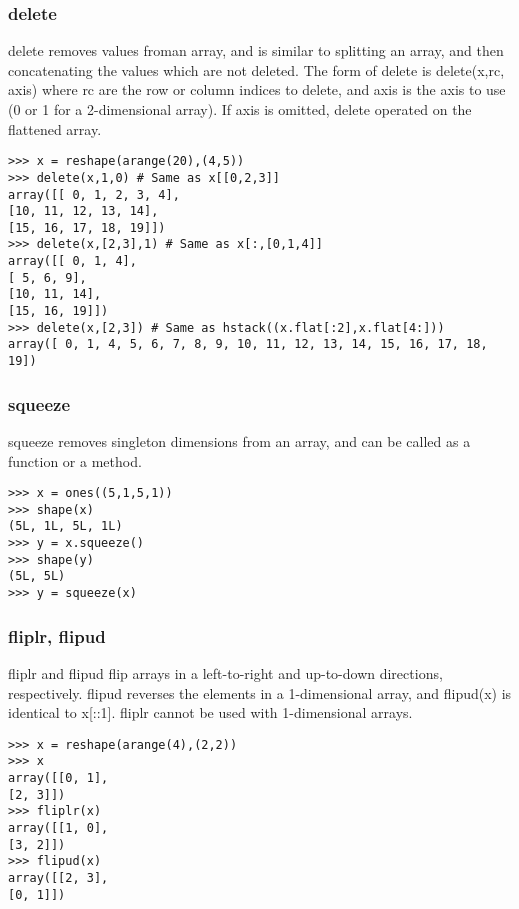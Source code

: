 \documentclass[KSmain.tex]{subfiles}
\begin{document}
\subsubsection{delete}
delete removes values froman array, and is similar to splitting an array, and then concatenating the values
which are not deleted. The form of delete is delete(x,rc, axis) where rc are the row or column indices to
delete, and axis is the axis to use (0 or 1 for a 2-dimensional array). If axis is omitted, delete operated on
the flattened array.
\begin{framed}
\begin{verbatim}
>>> x = reshape(arange(20),(4,5))
>>> delete(x,1,0) # Same as x[[0,2,3]]
array([[ 0, 1, 2, 3, 4],
[10, 11, 12, 13, 14],
[15, 16, 17, 18, 19]])
>>> delete(x,[2,3],1) # Same as x[:,[0,1,4]]
array([[ 0, 1, 4],
[ 5, 6, 9],
[10, 11, 14],
[15, 16, 19]])
>>> delete(x,[2,3]) # Same as hstack((x.flat[:2],x.flat[4:]))
array([ 0, 1, 4, 5, 6, 7, 8, 9, 10, 11, 12, 13, 14, 15, 16, 17, 18,
19])
\end{verbatim}
\end{framed}
\subsubsection{squeeze}
squeeze removes singleton dimensions from an array, and can be called as a function or a method.
\begin{framed}
\begin{verbatim}
>>> x = ones((5,1,5,1))
>>> shape(x)
(5L, 1L, 5L, 1L)
>>> y = x.squeeze()
>>> shape(y)
(5L, 5L)
>>> y = squeeze(x)
\end{verbatim}
\end{framed}
\subsubsection{fliplr, flipud}
fliplr and flipud flip arrays in a left-to-right and up-to-down directions, respectively. flipud reverses
the elements in a 1-dimensional array, and flipud(x) is identical to x[::1].
fliplr cannot be used with 1-dimensional arrays.
\begin{framed}
\begin{verbatim}
>>> x = reshape(arange(4),(2,2))
>>> x
array([[0, 1],
[2, 3]])
>>> fliplr(x)
array([[1, 0],
[3, 2]])
>>> flipud(x)
array([[2, 3],
[0, 1]])
\end{verbatim}
\end{framed}
\end{document}
